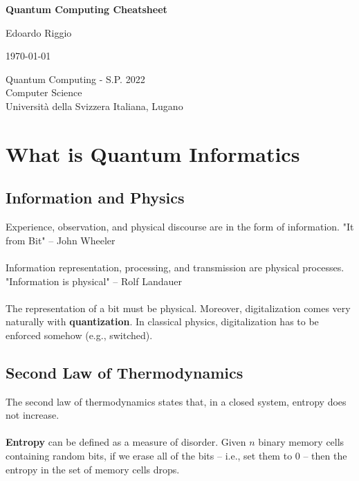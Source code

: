 \documentclass{article}
\begin{document}
\begin{titlepage}
    \begin{center}
        \vspace*{1cm}
        
        \Huge
        \textbf{Quantum Computing Cheatsheet}
        
        \vspace{0.5cm}
        \LARGE
        
        \vspace{.5cm}
        
        Edoardo Riggio
   		  \vspace{1.5cm}
       
        \vfill
        
        \today
        
        \vspace{.8cm}
          \Large
          Quantum Computing - S.P. 2022 \\
        Computer Science\\
        Universit\`{a} della Svizzera Italiana, Lugano\\
        
    \end{center}
\end{titlepage}

\tableofcontents

\newpage

\section{What is Quantum Informatics}
\subsection{Information and Physics}
Experience, observation, and physical discourse are in the form of information. "It from Bit" -- John Wheeler \\ \\
Information representation, processing, and transmission are physical processes. "Information is physical" -- Rolf Landauer \\ \\
The representation of a bit must be physical. Moreover, digitalization comes very naturally with \textbf{quantization}. In classical physics, digitalization has to be enforced somehow (e.g., switched).

\subsection{Second Law of Thermodynamics}
The second law of thermodynamics states that, in a closed system, entropy does not increase. \\ \\
\textbf{Entropy} can be defined as a measure of disorder. Given $n$ binary memory cells containing random bits, if we erase all of the bits -- i.e., set them to 0 -- then the entropy in the set of memory cells drops.
\end{document}
